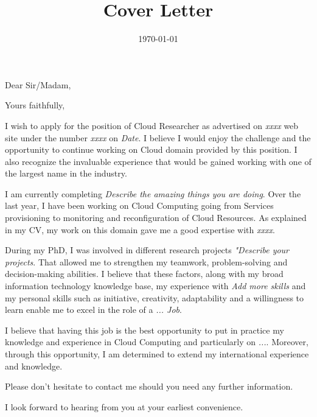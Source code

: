 \documentclass[11pt,a4paper,sans]{moderncv}        %
\title{Cover Letter}                               %
\begin{document}
\date{\today}
\opening{Dear Sir/Madam,}
\closing{Yours faithfully,}         %
\makelettertitle

I wish to apply for the position of Cloud Researcher as advertised on \emph{xxxx} web site under the number \emph{xxxx} on \emph{Date}. I believe I would enjoy the challenge and the opportunity to continue working on Cloud domain provided by this position. I also recognize the invaluable experience that would be gained working with one of the largest name in the industry.

I am currently completing \emph{Describe the amazing things you are doing}. Over the last year, I have been working on Cloud Computing going from Services provisioning to monitoring and reconfiguration of Cloud Resources.
As explained in my CV, my work on this domain gave me a good expertise with \emph{xxxx}. 

During my PhD, I was involved in different research projects \emph{"Describe your projects}. That allowed me to strengthen my teamwork, problem-solving and decision-making abilities. I believe that these factors, along with my broad information technology knowledge base, my experience with \emph{Add more skills} and my personal skills such as initiative, creativity, adaptability and a willingness to learn enable me to excel in the role of a \emph{... Job}. 

I believe that having this job is the best opportunity to put in practice my knowledge and experience in Cloud Computing and particularly on \emph{...}. Moreover, through this opportunity, I am determined to extend my international experience and knowledge. 

Please don't hesitate to contact me should you need any further information.

I look forward to hearing from you at your earliest convenience.



\makeletterclosing
\end{document}
